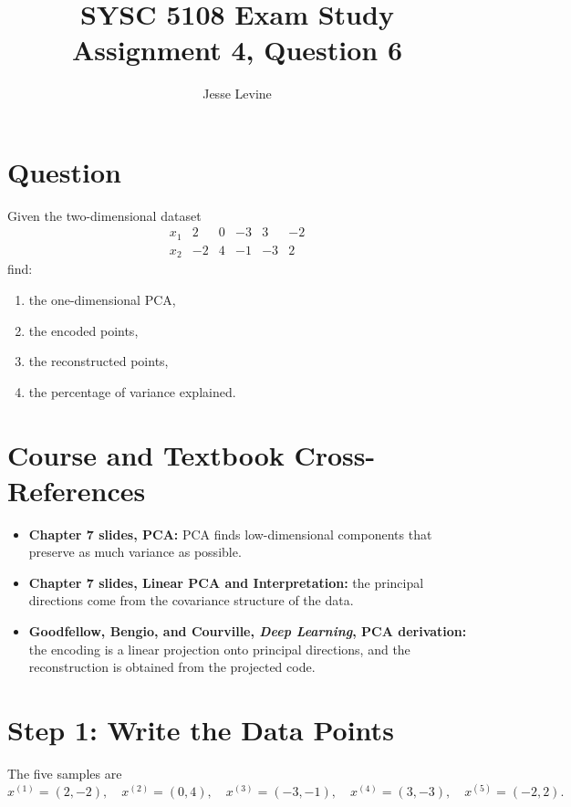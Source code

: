 \documentclass[11pt]{article}
\title{SYSC 5108 Exam Study\\Assignment 4, Question 6}
\author{Jesse Levine}
\date{}
\begin{document}
\maketitle

\section*{Question}

Given the two-dimensional dataset
\[
\begin{array}{c|ccccc}
    x_1 & 2 & 0 & -3 & 3 & -2\\
    x_2 & -2 & 4 & -1 & -3 & 2
\end{array}
\]
find:
\begin{enumerate}[label=(\alph*)]
    \item the one-dimensional PCA,
    \item the encoded points,
    \item the reconstructed points,
    \item the percentage of variance explained.
\end{enumerate}

\section*{Course and Textbook Cross-References}

\begin{itemize}
    \item \textbf{Chapter 7 slides, PCA:} PCA finds low-dimensional components
    that preserve as much variance as possible.
    \item \textbf{Chapter 7 slides, Linear PCA and Interpretation:} the principal
    directions come from the covariance structure of the data.
    \item \textbf{Goodfellow, Bengio, and Courville, \emph{Deep Learning}, PCA derivation:}
    the encoding is a linear projection onto principal directions, and the
    reconstruction is obtained from the projected code.
\end{itemize}

\section*{Step 1: Write the Data Points}

The five samples are
\[
    x^{(1)}=(2,-2),\quad
    x^{(2)}=(0,4),\quad
    x^{(3)}=(-3,-1),\quad
    x^{(4)}=(3,-3),\quad
    x^{(5)}=(-2,2).
\]
\end{document}
